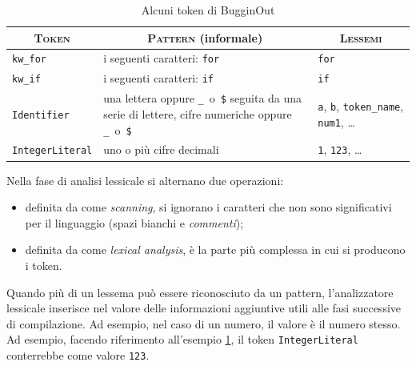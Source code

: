 \begin{table}[H]
	\begin{tabularx}{\textwidth}{X|X|X}
		\hline
		\hline
		\multicolumn{1}{c|}{\textsc{Token}} & \multicolumn{1}{c|}{\textsc{Pattern} (informale)} & \multicolumn{1}{c}{\textsc{Lessemi}} \\
		\hline
		\texttt{kw\_for} & i seguenti caratteri: \texttt{for} & \texttt{for} \\
		\hline
		\texttt{kw\_if} & i seguenti caratteri: \texttt{if} & \texttt{if} \\
		\hline
		\texttt{Identifier} & una lettera oppure \mbox{\texttt{\_} o \texttt{\$}} seguita da una serie di lettere, cifre numeriche oppure \mbox{\texttt{\_} o \texttt{\$}} & \texttt{a}, \texttt{b}, \texttt{token\_name}, \texttt{num1}, \ldots \\
		\hline
		\texttt{IntegerLiteral} & uno o pi\`u cifre decimali\footnotemark & \texttt{1}, \texttt{123}, \ldots \\
		\hline
		\hline
	\end{tabularx}
	\caption{Alcuni token di BugginOut}
	\label{fig:bugginout-example-tokens}
\end{table}


Nella fase di analisi lessicale si alternano due operazioni:
\begin{itemize}
	\item definita da \cite{alfred2007compilers} come \emph{scanning}, si ignorano i caratteri che non sono significativi per il linguaggio (spazi bianchi e \emph{commenti});
	\item definita da \cite{alfred2007compilers} come \emph{lexical analysis}, \`e la parte pi\`u complessa in cui si producono i token.
\end{itemize}

Quando pi\`u di un lessema pu\`o essere riconosciuto da un pattern, l'analizzatore lessicale inserisce nel valore delle informazioni aggiuntive utili alle fasi successive di compilazione. Ad esempio, nel caso di un numero, il valore \`e il numero stesso. Ad esempio, facendo riferimento all'esempio \ref{fig:bugginout-example-tokens}, il token \texttt{IntegerLiteral} conterrebbe come valore \texttt{123}.

